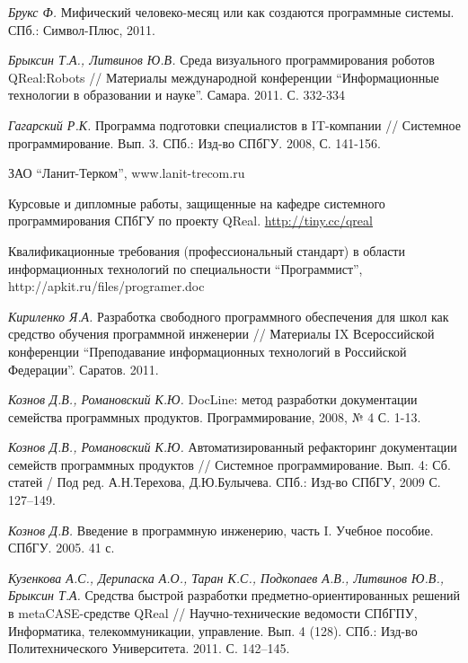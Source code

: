 \documentclass[a4paper]{article}
\begin{document}
\begin{thebibliography}{9001}

   \emph{Брукс Ф.} Мифический человеко-месяц или как создаются программные системы. СПб.: Символ-Плюс, 2011.
  
   \emph{Брыксин Т.А., Литвинов Ю.В.} Среда визуального программирования роботов QReal:Robots // Материалы международной конференции ``Информационные технологии в образовании и науке''. Самара. 2011. С. 332-334
  
   \emph{Гагарский Р.К.} Программа подготовки специалистов в IT-компании // Системное программирование. Вып. 3. СПб.: Изд-во СПбГУ. 2008, С. 141-156.
  
   ЗАО ``Ланит-Терком'', www.lanit-trecom.ru

   Курсовые и дипломные работы, защищенные на кафедре системного программирования СПбГУ по проекту QReal. \url{http://tiny.cc/qreal}

   Квалификационные требования (профессиональный стандарт) в области информационных технологий по специальности ``Программист'', http://apkit.ru/files/programer.doc
  
   \emph{Кириленко Я.А.} Разработка свободного программного обеспечения для школ как средство обучения программной инженерии // Материалы IX Всероссийской конференции ``Преподавание информационных технологий в Российской Федерации''. Саратов. 2011.
  
   \emph{Кознов Д.В., Романовский К.Ю.}  DocLine: метод разработки документации семейства программных продуктов. Программирование, 2008, № 4 С. 1-13.

   \emph{Кознов Д.В., Романовский К.Ю.} Автоматизированный рефакторинг документации семейств программных продуктов // Системное программирование. Вып. 4: Сб. статей / Под ред. А.Н.Терехова, Д.Ю.Булычева. СПб.: Изд-во СПбГУ, 2009 С. 127--149.
  
   \emph{Кознов Д.В.} Введение в программную инженерию, часть I. Учебное пособие. СПбГУ. 2005. 41 с. 
  
   \emph{Кузенкова А.С., Дерипаска А.О., Таран К.С., Подкопаев А.В., Литвинов Ю.В., Брыксин Т.А.} Средства быстрой разработки предметно-ориентированных решений в metaCASE-средстве QReal // Научно-технические ведомости СПбГПУ, Информатика, телекоммуникации, управление. Вып. 4 (128). СПб.: Изд-во Политехнического Университета. 2011. С. 142--145.


\end{thebibliography}
\end{document}
